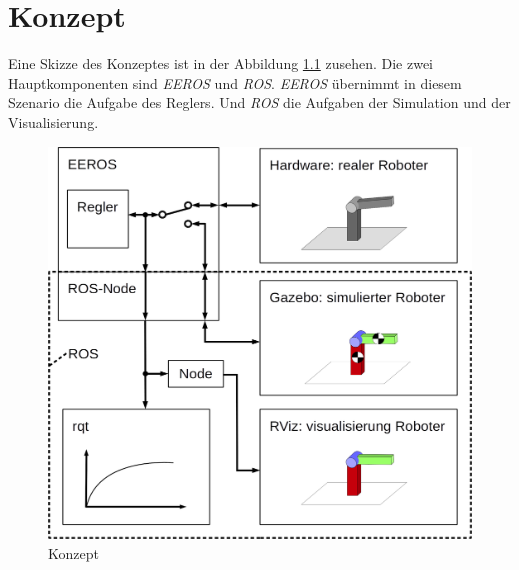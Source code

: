 \chapter{Konzept}

Eine Skizze des Konzeptes ist in der Abbildung \ref{Ab:konzept}
zusehen.
Die zwei Hauptkomponenten sind \textit{EEROS} und \textit{ROS}.
\textit{EEROS} übernimmt in diesem Szenario die Aufgabe des Reglers.
Und \textit{ROS} die Aufgaben der Simulation und der Visualisierung.

\begin{figure}[ht!]
	\centering
	\includegraphics[width=14.5cm]{images/Konzept.png}
	\caption{Konzept}
	\label{Ab:konzept}
\end{figure}

